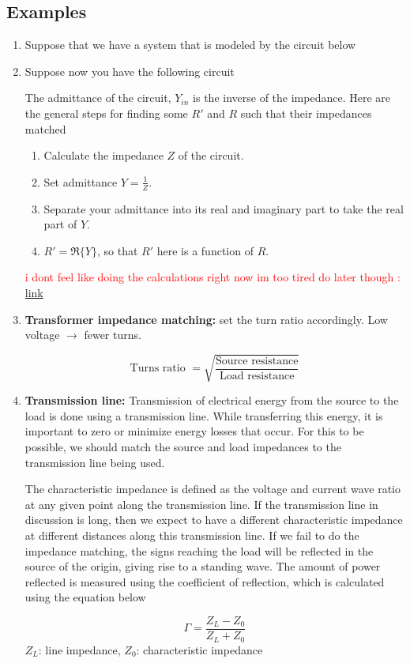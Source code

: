 \subsection{Examples}
\begin{enumerate}
    \item Suppose that we have a system that is modeled by the circuit below
        

    \item Suppose now you have the following circuit
        
        The admittance of the circuit, $Y_{in}$ is the inverse of the impedance. Here are the general steps for finding some $R'$ and $R$ such that their impedances matched
        \begin{enumerate}
            \item Calculate the impedance $Z$ of the circuit.
            \item Set admittance $Y = \frac{1}{Z}$.
            \item Separate your admittance into its real and imaginary part to take the real part of $Y$.
            \item $R' = \Re\{Y\}$, so that $R'$ here is a function of $R$.
        \end{enumerate}

    \textcolor{red}{i dont feel like doing the calculations right now im too tired do later though : \href{https://eepower.com/technical-articles/understanding-impedance-matching}{link}}

    \item \textbf{Transformer impedance matching:} set the turn ratio accordingly. Low voltage $\rightarrow$ fewer turns. 
        \begin{define}
            \[\text{Turns ratio }= \sqrt{\frac{\text{Source resistance}}{\text{Load resistance}}}\]
        \end{define}
    
    \item \textbf{Transmission line:} Transmission of electrical energy from the source to the load is done using a transmission line. While transferring this energy, it is important to zero or minimize energy losses that occur. For this to be possible, we should match the source and load impedances to the transmission line being used.
    
    The characteristic impedance is defined as the voltage and current wave ratio at any given point along the transmission line. If the transmission line in discussion is long, then we expect to have a different characteristic impedance at different distances along this transmission line. If we fail to do the impedance matching, the signs reaching the load will be reflected in the source of the origin, giving rise to a standing wave. The amount of power reflected is measured using the coefficient of reflection, which is calculated using the equation below
        \begin{define}
            \[\Gamma  = \frac{Z_L - Z_0}{Z_L + Z_0}\]
            $Z_L$: line impedance, $Z_0$: characteristic impedance
        \end{define}


\end{enumerate}
